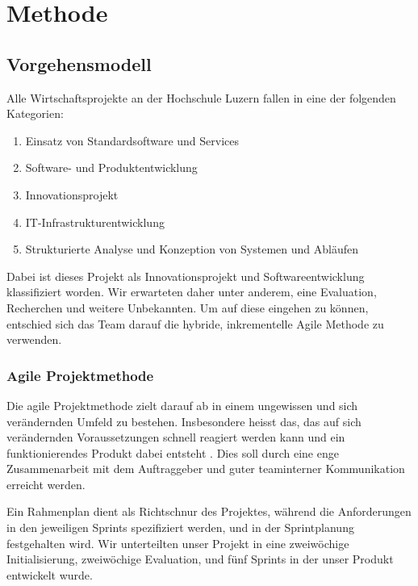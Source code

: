 \documentclass[a4paper]{scrreprt}
\begin{document}
\chapter{Methode}

\section{Vorgehensmodell}

Alle Wirtschaftsprojekte an der Hochschule Luzern fallen in eine der folgenden Kategorien:

\begin{enumerate}
	\item Einsatz von Standardsoftware und Services
	\item Software- und Produktentwicklung
	\item Innovationsprojekt
	\item IT-Infrastrukturentwicklung
	\item Strukturierte Analyse und Konzeption von Systemen und Abläufen
\end{enumerate}

Dabei ist dieses Projekt als Innovationsprojekt und Softwareentwicklung klassifiziert worden. Wir erwarteten daher unter anderem, eine Evaluation, Recherchen und weitere Unbekannten. Um auf diese eingehen zu können, entschied sich das Team darauf die hybride, inkrementelle Agile Methode zu verwenden.

\subsection{Agile Projektmethode}

Die agile Projektmethode zielt darauf ab in einem ungewissen und sich verändernden Umfeld zu bestehen. Insbesondere heisst das, das auf sich verändernden Voraussetzungen schnell reagiert werden kann und ein funktionierendes Produkt dabei entsteht \parencite{AgileAlliance2015}. Dies soll durch eine enge Zusammenarbeit mit dem Auftraggeber und guter teaminterner Kommunikation erreicht werden.

Ein Rahmenplan dient als Richtschnur des Projektes, während die Anforderungen in den jeweiligen Sprints spezifiziert werden, und in der Sprintplanung festgehalten wird. Wir unterteilten unser Projekt in eine zweiwöchige Initialisierung, zweiwöchige Evaluation, und fünf Sprints in der unser Produkt entwickelt wurde.
\end{document}
